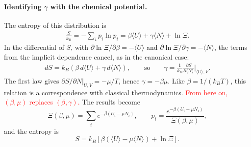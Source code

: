 \paragraph{Identifying $\gamma$ with the chemical potential.}
The entropy of this distribution is
\begin{align*}
    \frac{S}{k_B}=-\sum_i p_i\ln p_i
    =\beta\langle U\rangle+\gamma\langle N\rangle+\ln\Xi.
\end{align*}
In the differential of $S$, with $\partial\ln\Xi/\partial\beta=-\langle
U\rangle$ and $\partial\ln\Xi/\partial\gamma=-\langle N\rangle$, the terms
from the implicit dependence cancel, as in the canonical case:
\begin{align*}
    dS=k_B\left(\beta\,d\langle U\rangle+\gamma\,d\langle N\rangle\right),
    \qquad\text{so}\qquad
    \gamma=\frac{1}{k_B}\frac{\partial S}{\partial\langle N\rangle}\bigg|_{\langle U\rangle,V}.
\end{align*}
The first law gives $\partial S/\partial N|_{U,V}=-\mu/T$, hence
$\gamma=-\beta\mu$. Like $\beta=1/(k_BT)$, this relation is a correspondence
with classical thermodynamics. \textcolor{red}{From here on, $(\beta,\mu)$
replaces $(\beta,\gamma)$.} The results become
\begin{equation}
    \boxed{\Xi(\beta,\mu)=\sum_i e^{-\beta(U_i-\mu N_i)},
    \qquad
    p_i=\frac{e^{-\beta(U_i-\mu N_i)}}{\Xi(\beta,\mu)},}
\end{equation}
and the entropy is
\begin{equation}
    \boxed{S=k_B\left[\beta\left(\langle U\rangle-\mu\langle N\rangle\right)+\ln\Xi\right].}
\end{equation}

